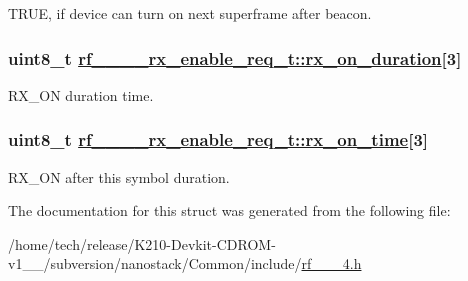 TRUE, if device can turn on next superframe after beacon. \hypertarget{structrf__802__15__4__rx__enable__req__t_bd360feb833cebf250df3569133ed945}{
\subsubsection[rx\_\-on\_\-duration]{\setlength{\rightskip}{0pt plus 5cm}uint8\_\-t \hyperlink{structrf__802__15__4__rx__enable__req__t_bd360feb833cebf250df3569133ed945}{rf\_\_\_\_\-rx\_\-enable\_\-req\_\-t::rx\_\-on\_\-duration}\mbox{[}3\mbox{]}}}
\label{structrf__802__15__4__rx__enable__req__t_bd360feb833cebf250df3569133ed945}


RX\_\-ON duration time. \hypertarget{structrf__802__15__4__rx__enable__req__t_4d952ca97d8eb8df58e535c9e76b0c67}{
\subsubsection[rx\_\-on\_\-time]{\setlength{\rightskip}{0pt plus 5cm}uint8\_\-t \hyperlink{structrf__802__15__4__rx__enable__req__t_4d952ca97d8eb8df58e535c9e76b0c67}{rf\_\_\_\_\-rx\_\-enable\_\-req\_\-t::rx\_\-on\_\-time}\mbox{[}3\mbox{]}}}
\label{structrf__802__15__4__rx__enable__req__t_4d952ca97d8eb8df58e535c9e76b0c67}


RX\_\-ON after this symbol duration. 

The documentation for this struct was generated from the following file:\begin{CompactItemize}
\item 
/home/tech/release/K210-Devkit-CDROM-v1\_\_/subversion/nanostack/Common/include/\hyperlink{rf__802__15__4_8h}{rf\_\_\_\-4.h}\end{CompactItemize}
